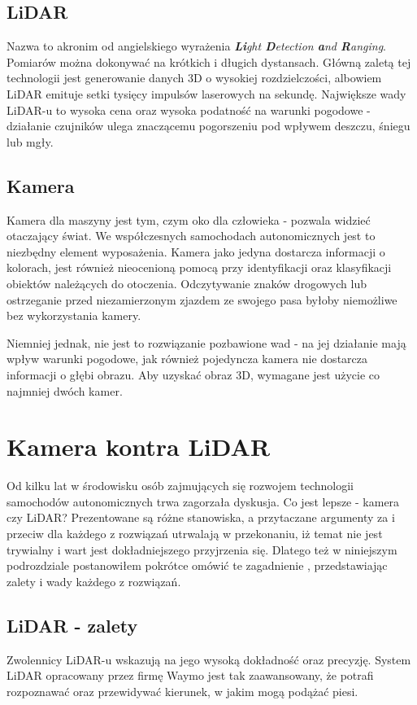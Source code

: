 \subsection{LiDAR}
Nazwa to akronim od angielskiego wyrażenia \textit{\textbf{Li}ght \textbf{D}etection \textbf{a}nd \textbf{R}anging}. Pomiarów można dokonywać na krótkich i długich dystansach. Główną zaletą tej technologii jest generowanie danych 3D o wysokiej rozdzielczości, albowiem LiDAR emituje setki tysięcy impulsów laserowych na sekundę. Największe wady LiDAR-u to wysoka cena oraz wysoka podatność na warunki pogodowe - działanie czujników ulega znaczącemu pogorszeniu pod wpływem deszczu, śniegu lub mgły.

\subsection{Kamera}
Kamera dla maszyny jest tym, czym oko dla człowieka - pozwala widzieć otaczający świat. We współczesnych samochodach autonomicznych jest to niezbędny element wyposażenia. Kamera jako jedyna dostarcza informacji o kolorach, jest również nieocenioną pomocą przy identyfikacji oraz klasyfikacji obiektów należących do otoczenia. Odczytywanie znaków drogowych lub ostrzeganie przed niezamierzonym zjazdem ze swojego pasa byłoby niemożliwe bez wykorzystania kamery.

Niemniej jednak, nie jest to rozwiązanie pozbawione wad - na jej działanie mają wpływ warunki pogodowe, jak również pojedyncza kamera nie dostarcza informacji o głębi obrazu. Aby uzyskać obraz 3D, wymagane jest użycie co najmniej dwóch kamer.

\section{Kamera kontra LiDAR}
Od kilku lat w środowisku osób zajmujących się rozwojem technologii samochodów autonomicznych trwa zagorzała dyskusja. Co jest lepsze - kamera czy LiDAR? Prezentowane są różne stanowiska, a przytaczane argumenty za i przeciw dla każdego z rozwiązań utrwalają w przekonaniu, iż temat nie jest trywialny i wart jest dokładniejszego przyjrzenia się. Dlatego też w niniejszym podrozdziale postanowiłem pokrótce omówić te zagadnienie \cite{autopilotReview:lidarVsCamera}, przedstawiając zalety i wady każdego z rozwiązań.

\subsection{LiDAR - zalety}
Zwolennicy LiDAR-u wskazują na jego wysoką dokładność oraz precyzję. System LiDAR opracowany przez firmę Waymo jest tak zaawansowany, że potrafi rozpoznawać oraz przewidywać kierunek, w jakim mogą podążać piesi.

